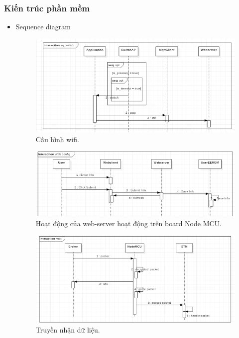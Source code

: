 \documentclass[a4paper,12pt,oneside]{article}
\begin{document}
\subsubsection{Kiến trúc phần mềm}

\begin{itemize}

\item Sequence diagram

\begin{figure}[H]
	\centering
	\includegraphics[scale=.9]{hinh/sq_switch_wifi.PNG}
	\caption{Cấu hình wifi.}
\end{figure}

\begin{figure}[H]
	\centering
	\includegraphics[scale=.8]{hinh/sq_web.PNG}
	\caption{Hoạt động của web-server hoạt động trên board Node MCU.}
\end{figure}

\begin{figure}[H]
	\centering
	\includegraphics[scale=.8]{hinh/sq_mqtt.PNG}
	\caption{Truyền nhận dữ liệu.}
\end{figure}


\end{itemize}
\end{document}
